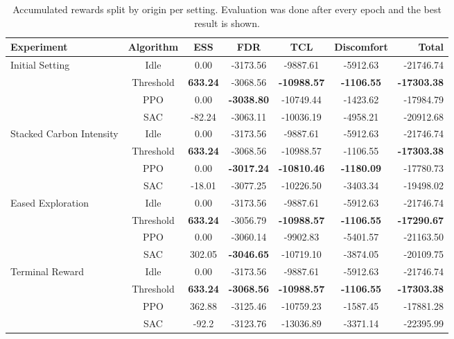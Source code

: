 \begin{table}[t]
\caption{Accumulated rewards split by origin per setting. Evaluation was done after every epoch and the best result is shown.}
\label{tab:experiments}
\vskip 0.15in
\begin{center}
\begin{small}
\begin{sc}
\begin{tabular}{lcccccr}
\toprule
Experiment & Algorithm & ESS & FDR & TCL & Discomfort & Total \\
\midrule
\multirow{4}{*}{Initial Setting} 
    & Idle      & 0.00   & -3173.56 & -9887.61  & -5912.63  & -21746.74 \\
    & Threshold & \textbf{633.24} & -3068.56 & \textbf{-10988.57} & \textbf{-1106.55}  & \textbf{-17303.38} \\
    & PPO       & 0.00   & \textbf{-3038.80} & -10749.44 & -1423.62  & -17984.79 \\
    & SAC       & -82.24 & -3063.11 & -10036.19 & -4958.21  & -20912.68 \\
\midrule
\multirow{4}{*}{Stacked Carbon Intensity}
    & Idle      & 0.00   & -3173.56 & -9887.61  & -5912.63  & -21746.74 \\
    & Threshold & \textbf{633.24} & -3068.56 & -10988.57 & -1106.55  &  \textbf{-17303.38} \\
    & PPO       & 0.00   & \textbf{-3017.24} & \textbf{-10810.46} &  \textbf{-1180.09}  & -17780.73 \\
    & SAC       & -18.01 & -3077.25 & -10226.50 & -3403.34  & -19498.02 \\
\midrule
\multirow{4}{*}{Eased Exploration}
    & Idle      & 0.00   & -3173.56 & -9887.61  & -5912.63 & -21746.74 \\
    & Threshold & \textbf{633.24} & -3056.79 & \textbf{-10988.57} & \textbf{-1106.55} & \textbf{-17290.67} \\
    & PPO       & 0.00   & -3060.14 & -9902.83  & -5401.57 & -21163.50  \\
    & SAC       & 302.05 & \textbf{-3046.65} & -10719.10 & -3874.05 & -20109.75  \\
\midrule
\multirow{4}{*}{Terminal Reward} 
    & Idle      & 0.00   & -3173.56 & -9887.61  & -5912.63  & -21746.74 \\
    & Threshold & \textbf{633.24} & \textbf{-3068.56} & \textbf{-10988.57} & \textbf{-1106.55}  & \textbf{-17303.38} \\
    & PPO       & 362.88 & -3125.46 & -10759.23 & -1587.45  & -17881.28 \\
    & SAC       & -92.2  & -3123.76 & -13036.89 & -3371.14  & -22395.99 \\
\bottomrule
\end{tabular}
\end{sc}
\end{small}
\end{center}
\vskip -0.1in
\end{table}

